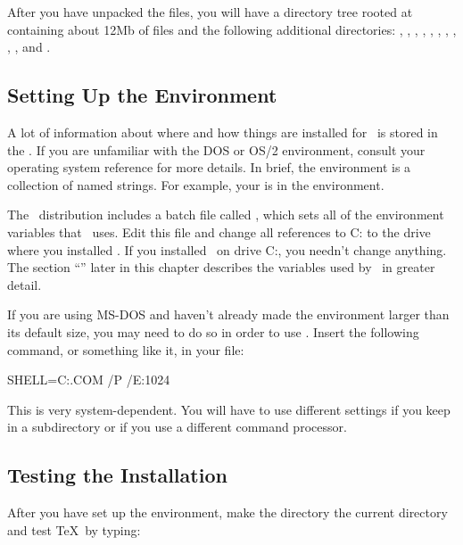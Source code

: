 After you have unpacked the files, you will have a directory tree rooted
at  containing about 12Mb of files and the following additional
directories: , , , ,
, , , , ,
, and .

\newpage
\subsection{Setting Up the Environment}

A lot of information about where and how things are installed for \emTeX\ is
stored in the .  If you are unfamiliar with the DOS or OS/2
environment, consult your operating system reference for more details.  In
brief, the environment is a collection of named
strings.  For example, your  is in the environment.

The \emTeX\ distribution includes a batch file called
, which 
sets all of the environment variables that
\emTeX\ uses.  Edit this file and
change all references to C: to the drive where you
installed \emTeX.  If you installed \emTeX\ on drive C:, you needn't
change anything.  The section ``''
later in this chapter
describes the variables used by \emTeX\ in greater detail.

If you are using MS-DOS and haven't already made the environment
larger than its default size, you may need to do so in order to use
\emTeX.  Insert the following command, or something like it, in your
 file:

\begin{shortexample}
SHELL=C:\COMMAND.COM /P /E:1024
\end{shortexample}

This is very system-dependent. You will have to use different
settings if you keep  in a subdirectory or if you
use a different command processor.

\subsection{Testing the Installation}
\label{sec:emtex:testinstall}

After you 
have set up the environment, make the  directory the
current directory and test \TeX\ by typing:

